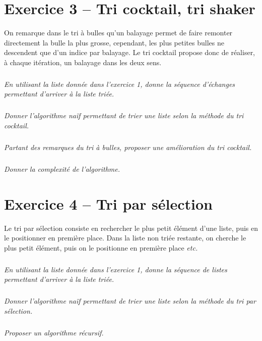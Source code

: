 \documentclass[10pt,fleqn]{article} %
\begin{document}
\begin{multicols}{2}
\section*{Exercice 3 -- Tri cocktail, tri shaker}
On remarque dans le tri à bulles qu'un balayage permet de faire remonter directement la bulle la plus grosse, cependant, les plus petites bulles ne descendent que d'un indice par balayage. Le tri cocktail propose donc de réaliser, à chaque itération, un balayage dans les deux sens. 
\setcounter{exo}{0}
\subparagraph{}
\textit{En utilisant la liste donnée dans l'exercice 1, donne la séquence d'échanges permettant d'arriver à la liste triée.}

\subparagraph{}
\textit{Donner l'algorithme naïf permettant de trier une liste selon la méthode du tri cocktail.}
\ifprof
\begin{corrige}
\end{corrige}
\else
\fi

\subparagraph{}
\textit{Partant des remarques du tri à bulles, proposer une amélioration du tri cocktail.}

\subparagraph{}
\textit{Donner la complexité de l'algorithme.}



\section*{Exercice 4 -- Tri par sélection}
Le tri par sélection consiste en rechercher le plus petit élément d'une liste, puis en le positionner en première place. Dans la liste non triée restante, on cherche le plus petit élément, puis on le positionne en première place \textit{etc.}
\setcounter{exo}{0}
\subparagraph{}
\textit{En utilisant la liste donnée dans l'exercice 1, donne la séquence de listes permettant d'arriver à la liste triée.}

\subparagraph{}
\textit{Donner l'algorithme naïf permettant de trier une liste selon la méthode du tri par sélection.}

\subparagraph{}
\textit{Proposer un algorithme récursif.}

\end{multicols}
\end{document}
